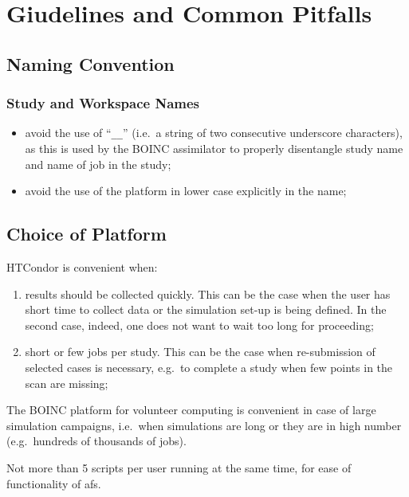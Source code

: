 \chapter{Giudelines and Common Pitfalls} \label{Guidelines}

\section{Naming Convention}
\subsection{Study and Workspace Names}
\begin{itemize}
\item avoid the use of ``\texttt{\_\_}'' (i.e.~a string of two
  consecutive underscore characters), as this is used by the BOINC
  assimilator to properly disentangle study name and name of job in
  the study;
\item avoid the use of the platform in lower case explicitly in the name;
\end{itemize}

\section{Choice of Platform}
HTCondor is convenient when:
\begin{enumerate}
\item results should be collected quickly. This can be the case when
  the user has short time to collect data or the simulation set-up
  is being defined. In the second case, indeed, one does not want to wait
  too long for proceeding;
\item short or few jobs per study. This can be the case when re-submission
  of selected cases is necessary, e.g.~to complete a study when few points
  in the scan are missing;
\end{enumerate}  

The BOINC platform for volunteer computing is convenient in case of
large simulation campaigns, i.e.~when simulations are long or they
are in high number (e.g.~hundreds of thousands of jobs).

Not more than 5 scripts per user running at the same time, for ease
of functionality of afs.
